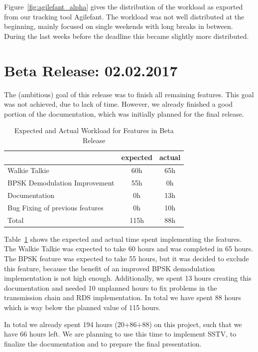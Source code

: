 	Figure~\ref{fig:agilefant_alpha} gives the distribution of the workload as exported from our tracking tool Agilefant. The workload was not well distributed at the beginning, mainly focused on single weekends with long breaks in between. During the last weeks before the deadline this became slightly more distributed. 

\section{Beta Release: 02.02.2017}
The (ambitious) goal of this release was to finish all remaining features. This goal was not achieved, due to lack of time. However, we already finished a good portion of the documentation, which was initially planned for the final release. 

\begin{table}
	\centering
	\caption{Expected and Actual Workload for Features in Beta Release}
	\label{tab:beta:features}
	\begin{tabular}{ l | c | c }
		& expected  & actual \\ \hline
		Walkie Talkie & 60h & 65h \\  \hline
		BPSK Demodulation Improvement & 55h & 0h \\  \hline
		Documentation & 0h & 13h \\ \hline \hline
		Bug Fixing of previous features & 0h & 10h \\ \hline \hline 
		Total & 115h & 88h 
	\end{tabular}
\end{table}
Table~\ref{tab:beta:features} shows the expected and actual time spent implementing the features. The Walkie Talkie was expected to take 60 hours and was completed in 65 hours. The BPSK feature was expected to take 55 hours, but it was decided to exclude this feature, because the benefit of an improved BPSK demodulation implementation is not high enough. 
Additionally, we spent 13 hours creating this documentation and needed 10 unplanned hours to fix problems in the transmission chain and RDS implementation. In total we have spent 88 hours which is way below the planned value of 115 hours. 

In total we already spent 194 hours (20+86+88) on this project, such that we have 66 hours left. We are planning to use this time to implement \ac{SSTV}, to finalize the documentation and to prepare the final presentation. 


